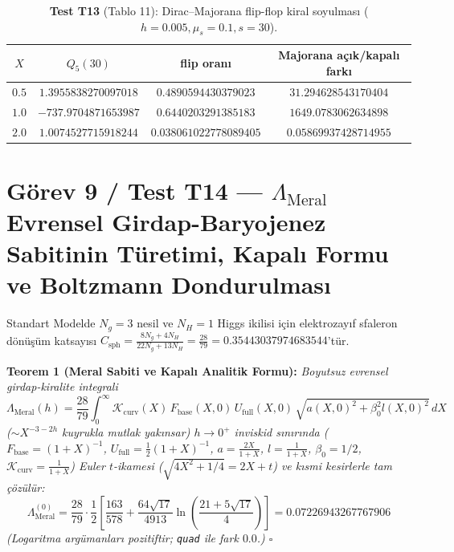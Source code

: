 \documentclass[12pt,a4paper]{article}
\begin{document}
\begin{table}[htbp]
\centering
\footnotesize
\setlength{\tabcolsep}{3pt}
\caption{\textbf{Test T13} (Tablo 11): Dirac--Majorana flip-flop kiral soyulması ($h=0.005, \mu_s=0.1, s=30$).}
\vspace{0.1cm}
\begin{tabular}{@{}c|ccc@{}}
\hline
$X$ & $Q_5(30)$ & flip oranı & Majorana açık/kapalı farkı \\
\hline
$0.5$ & $1.3955838270097018$ & $0.4890594430379023$ & $31.294628543170404$ \\
$1.0$ & $-737.9704871653987$ & $0.6440203291385183$ & $1649.0783062634898$ \\
$2.0$ & $1.0074527715918244$ & $0.038061022778089405$ & $0.05869937428714955$ \\
\hline
\end{tabular}
\end{table}

\section{Görev 9 / Test T14 --- $\Lambda_{\mathrm{Meral}}$ Evrensel Girdap-Baryojenez Sabitinin Türetimi, Kapalı Formu ve Boltzmann Dondurulması}

Standart Modelde $N_g = 3$ nesil ve $N_H = 1$ Higgs ikilisi için elektrozayıf sfaleron dönüşüm katsayısı $C_{\mathrm{sph}} = \frac{8N_g + 4N_H}{22N_g + 13N_H} = \frac{28}{79} = 0.35443037974683544$'tür.

\textbf{Teorem 1 (Meral Sabiti ve Kapalı Analitik Formu):} \textit{Boyutsuz evrensel girdap-kiralite integrali}
\begin{equation}
\Lambda_{\mathrm{Meral}}(h) = \frac{28}{79} \int_0^\infty \mathcal{K}_{\mathrm{curv}}(X) \, F_{\mathrm{base}}(X, 0) \, U_{\mathrm{full}}(X, 0) \, \sqrt{a(X, 0)^2 + \beta_0^2 l(X, 0)^2} \, dX
\label{eq:meral}
\end{equation}
\textit{($\sim X^{-3-2h}$ kuyrukla mutlak yakınsar) $h \to 0^+$ inviskid sınırında ($F_{\mathrm{base}} = (1+X)^{-1}$, $U_{\mathrm{full}} = \frac{1}{2}(1+X)^{-1}$, $a = \frac{2X}{1+X}$, $l = \frac{1}{1+X}$, $\beta_0 = 1/2$, $\mathcal{K}_{\mathrm{curv}} = \frac{1}{1+X}$) Euler $t$-ikamesi ($\sqrt{4X^2+1/4} = 2X+t$) ve kısmi kesirlerle tam çözülür:}
\begin{equation}
\boxed{\Lambda_{\mathrm{Meral}}^{(0)} = \frac{28}{79} \cdot \frac{1}{2} \left[ \frac{163}{578} + \frac{64\sqrt{17}}{4913} \ln\left( \frac{21 + 5\sqrt{17}}{4} \right) \right] = 0.07226943267767906}
\label{eq:meralclosed}
\end{equation}
\textit{(Logaritma argümanları pozitiftir; \texttt{quad} ile fark $0.0$.) $\square$}
\end{document}
